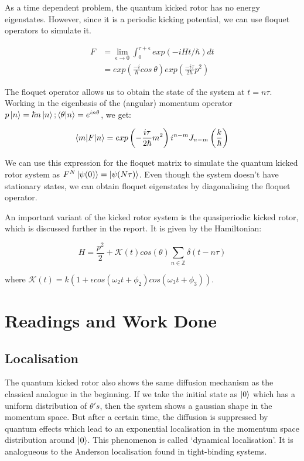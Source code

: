 \documentclass[twocolumn]{report}
\begin{document}
As a time dependent problem, the quantum kicked rotor has no energy eigenstates.
However, since it is a periodic kicking potential, we can use floquet operators
to simulate it.

\begin{align}
    F &= \lim_{\epsilon \to 0} \int_{0}^{\tau + \epsilon} exp(-iHt/\hbar) dt\\
    &= exp\left(\frac{-i}{\hbar} cos\ \theta\right)
    exp\left(\frac{-i\tau}{2\hbar}p^2\right)
\end{align}

The floquet operator allows us to obtain the state of the system at $t = n\tau$.
Working in the eigenbasis of the (angular) momentum operator
$p \ket{n} = \hbar n \ket{n}; \braket{\theta | n} = e^{in\theta}$, we get:

\begin{equation}
    \braket{m | F | n} = exp\left(-\frac{i \tau}{2\hbar}m^2\right) i^{n-m}
    J_{n-m}\left(\frac{k}{\hbar}\right)
\end{equation}

We can use this expression for the floquet matrix to simulate the quantum
kicked rotor system as $F^N \ket{\psi(0)} = \ket{\psi(N\tau)}$. Even though
the system doesn't have stationary states, we can obtain floquet eigenstates
by diagonalising the floquet operator.

An important variant of the kicked rotor system is the quasiperiodic kicked
rotor, which is discussed further in the report. It is given by the
Hamiltonian:

\begin{equation}
H = \frac{p^2}{2} + \mathcal{K}(t) cos(\theta)\sum_{n \in \mathbb{Z}}
\delta(t - n\tau)
\end{equation}

where $\mathcal{K}(t) = k(1 + \epsilon cos(\omega_2 t + \phi_2)
cos(\omega_3 t + \phi_3))$.

\chapter{Readings and Work Done}
\section{Localisation}
The quantum kicked rotor also shows the same diffusion mechanism as the
classical analogue in the beginning. If we take the initial state as $\ket{0}$
which has a uniform distribution of $\theta's$, then the system shows a
gaussian shape in the momentum space. But after a certain time, the
diffusion is suppressed by quantum effects which lead to an exponential
localisation in the momentum space distribution around $\ket{0}$. This
phenomenon is called `dynamical localisation'. It is analogueous to the
Anderson localisation found in tight-binding systems.
\end{document}
